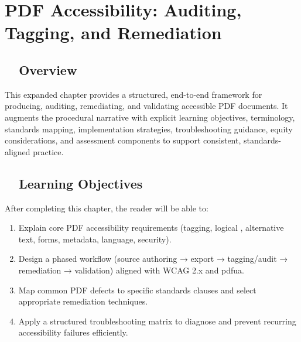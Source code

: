 \chapter{PDF Accessibility: Auditing, Tagging, and Remediation}

\section{~~Overview}\label{ch18:sec:overview}
This expanded chapter provides a structured, end-to-end framework for producing, auditing, remediating, and validating accessible PDF documents. It augments the procedural narrative with explicit learning objectives, terminology, standards mapping, implementation strategies, troubleshooting guidance, equity considerations, and assessment components to support consistent, standards-aligned practice.

\section{~~Learning Objectives}\label{ch18:sec:learning-objectives}
After completing this chapter, the reader will be able to:
\begin{enumerate}
	\item Explain core PDF accessibility requirements (tagging, logical , alternative text, forms, metadata, language, security).
	\item Design a phased workflow (source authoring → export → tagging/audit → remediation → validation) aligned with WCAG 2.x and \gls{pdfua}.
	\item Map common PDF defects to specific standards clauses and select appropriate remediation techniques.
	\item Apply a structured troubleshooting matrix to diagnose and prevent recurring accessibility failures efficiently.
\end{enumerate}

